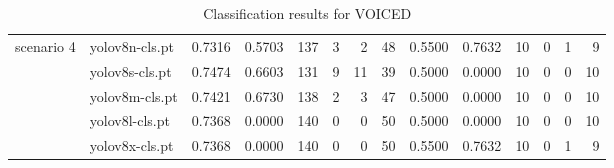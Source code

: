 \begin{table*}
\begin{tabular}{llrrrrrrrrrrrr}
			\midrule
			\multirow{5}{*}{scenario 4} & yolov8n-cls.pt & 0.7316 & 0.5703 & 137 & 3 & 2 & 48 & 0.5500 & 0.7632 & 10 & 0 & 1 & 9 \\
			 & yolov8s-cls.pt & 0.7474 & 0.6603 & 131 & 9 & 11 & 39 & 0.5000 & 0.0000 & 10 & 0 & 0 & 10 \\
			 & yolov8m-cls.pt & 0.7421 & 0.6730 & 138 & 2 & 3 & 47 & 0.5000 & 0.0000 & 10 & 0 & 0 & 10 \\
			 & yolov8l-cls.pt & 0.7368 & 0.0000 & 140 & 0 & 0 & 50 & 0.5000 & 0.0000 & 10 & 0 & 0 & 10 \\
			 & yolov8x-cls.pt & 0.7368 & 0.0000 & 140 & 0 & 0 & 50 & 0.5500 & 0.7632 & 10 & 0 & 1 & 9 \\
        \bottomrule
    \end{tabular}
    \caption{Classification results for VOICED}
    \label{tab:voiced_results}
\end{table*}